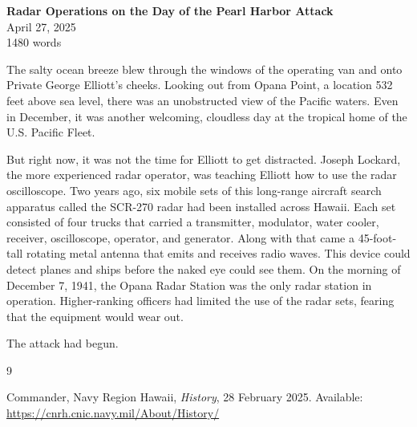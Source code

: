 \documentclass[12pt]{article}
\begin{document}
\begin{center}
\textbf{Radar Operations on the Day of the Pearl Harbor Attack} \\[0.5em]
April 27, 2025 \\[0.5em]
1480 words
\end{center}

\vspace{1em}

The salty ocean breeze blew through the windows of the operating van and onto Private George Elliott’s cheeks. Looking out from Opana Point, a location 532 feet above sea level, there was an unobstructed view of the Pacific waters. Even in December, it was another welcoming, cloudless day at the tropical home of the U.S. Pacific Fleet.

But right now, it was not the time for Elliott to get distracted. Joseph Lockard, the more experienced radar operator, was teaching Elliott how to use the radar oscilloscope. Two years ago, six mobile sets of this long-range aircraft search apparatus called the SCR-270 radar had been installed across Hawaii. Each set consisted of four trucks that carried a transmitter, modulator, water cooler, receiver, oscilloscope, operator, and generator. Along with that came a 45-foot-tall rotating metal antenna that emits and receives radio waves. This device could detect planes and ships before the naked eye could see them. On the morning of December 7, 1941, the Opana Radar Station was the only radar station in operation. Higher-ranking officers had limited the use of the radar sets, fearing that the equipment would wear out.

The attack had begun.

\begin{thebibliography}{9}

Commander, Navy Region Hawaii,
\textit{History},
28 February 2025.
Available: \url{https://cnrh.cnic.navy.mil/About/History/}

\end{thebibliography}
\end{document}

